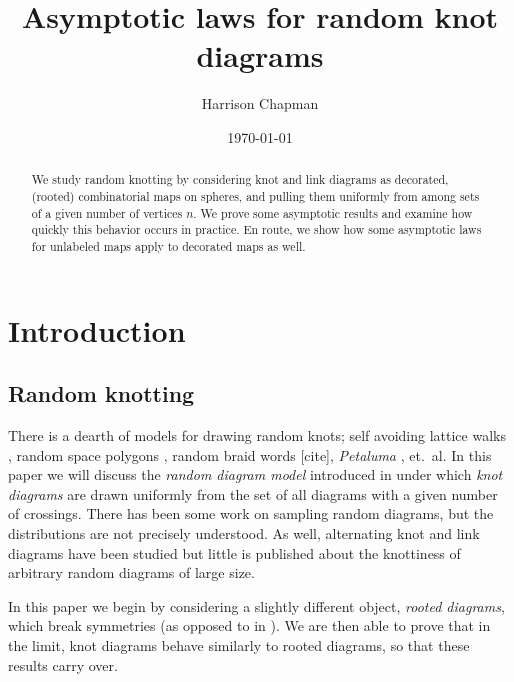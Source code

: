 \documentclass[amsmath,longbibliography,secnumarabic,floatfix,amssymb,nofootinbib,nobibnotes,letterpaper,11pt,tightenlines,notitlepage,showkeys,showlabels]{amsart}%
\theoremstyle{definition}
\begin{document}
\title[]{Asymptotic laws for random knot diagrams} \author{Harrison Chapman}
\address{Department of Mathematics\\
University of Georgia, Athens GA}
\date{\today}


\begin{abstract}
  We study random knotting by considering knot and link diagrams as
  decorated, (rooted) combinatorial maps on spheres, and pulling them
  uniformly from among sets of a given number of vertices $n$. We
  prove some asymptotic results and examine how quickly this behavior
  occurs in practice. En route, we show how some asymptotic laws for
  unlabeled maps apply to decorated maps as well.
\end{abstract}
\maketitle

\doublespacing
\section{Introduction}
\label{sec:intro}

\subsection{Random knotting}
\label{sec:random-knotting}

There is a dearth of models for drawing random knots; self avoiding
lattice walks \cite{Sumners_1988}, random space polygons
\cite{Cantarella_2015,Cantarella_2013}, random braid words [cite],
\emph{Petaluma} \cite{petaluma1}, et.\ al. In this paper we will
discuss the \emph{random diagram model} introduced in
\cite{CCMknotdiagrams2015} under which \emph{knot diagrams} are drawn
uniformly from the set of all diagrams with a given number of
crossings. There has been some work on sampling random
diagrams\cite{diaoernst2012pnmkt}, but the distributions
are not precisely understood.  As well, alternating knot and link
diagrams have been studied \cite{PZJasympconj2004} but little is
published about the knottiness of arbitrary random diagrams of large
size.

In this paper we begin by considering a slightly different object,
\emph{rooted diagrams}, which break symmetries (as opposed to in
). We are then able to prove that in the
limit, knot diagrams behave similarly to rooted diagrams, so that
these results carry over.
\end{document}
